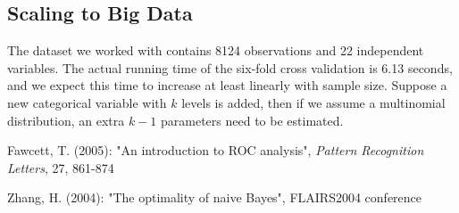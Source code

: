 \documentclass{article}
\begin{document}
\begin{multicols}{2}
\subsection{Scaling to Big Data}
The dataset we worked with contains 8124 observations and 22 independent variables. The actual running time of the six-fold cross validation is 6.13 seconds, and we expect this time to increase at least linearly with sample size. Suppose a new categorical variable with $k$ levels is added, then if we assume a multinomial distribution, an extra $k-1$ parameters need to be estimated. 







\begin{thebibliography}{}

\bibitem{}
	Fawcett, T. (2005):
	"An introduction to ROC analysis",
	\textit{Pattern Recognition Letters}, 27, 861-874  
  
\bibitem{}
	Zhang, H. (2004):
	"The optimality of naive Bayes",
	FLAIRS2004 conference
	
	
\end{thebibliography}


\end{multicols}
\end{document}
